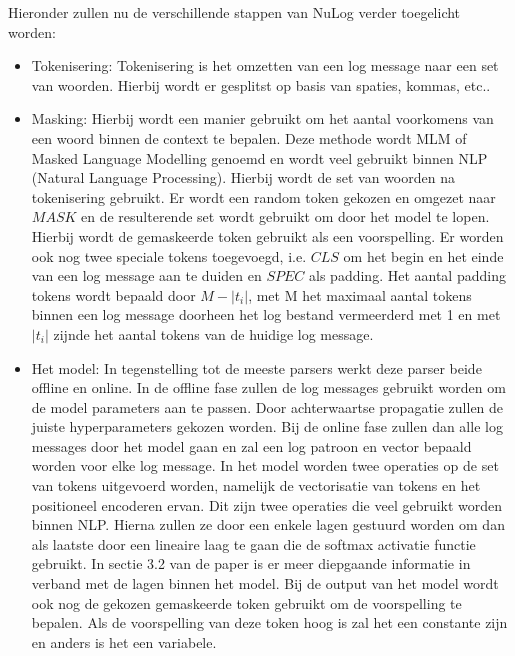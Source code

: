Hieronder zullen nu de verschillende stappen van NuLog verder toegelicht worden:
\begin{itemize}
    \item Tokenisering: Tokenisering is het omzetten van een log message naar een set van woorden. Hierbij wordt er gesplitst op basis van spaties, kommas, etc..\\
    
    \item Masking: Hierbij wordt een manier gebruikt om het aantal voorkomens van een woord binnen de context te bepalen. Deze methode wordt MLM of Masked Language Modelling genoemd en wordt veel gebruikt binnen NLP (Natural Language Processing). Hierbij wordt de set van woorden na tokenisering gebruikt. Er wordt een random token gekozen en omgezet naar $MASK$ en de resulterende set wordt gebruikt om door het model te lopen. Hierbij wordt de gemaskeerde token gebruikt als een voorspelling. Er worden ook nog twee speciale tokens toegevoegd, i.e. $CLS$ om het begin en het einde van een log message aan te duiden en $SPEC$ als padding. Het aantal padding tokens wordt bepaald door $M-\lvert t_{i} \rvert$, met M het maximaal aantal tokens binnen een log message doorheen het log bestand vermeerderd met 1 en met $\lvert t_{i} \rvert$ zijnde het aantal tokens van de huidige log message.\\
    
    \item Het model: In tegenstelling tot de meeste parsers werkt deze parser beide offline en online. In de offline fase zullen de log messages gebruikt worden om de model parameters aan te passen. Door achterwaartse propagatie zullen de juiste hyperparameters gekozen worden. Bij de online fase zullen dan alle log messages door het model gaan en zal een log patroon en vector bepaald worden voor elke log message. In het model worden twee operaties op de set van tokens uitgevoerd worden, namelijk de vectorisatie van tokens en het positioneel encoderen ervan. Dit zijn twee operaties die veel gebruikt worden binnen NLP. Hierna zullen ze door een enkele lagen gestuurd worden om dan als laatste door een lineaire laag te gaan die de softmax activatie functie gebruikt. In sectie 3.2 van de paper is er meer diepgaande informatie in verband met de lagen binnen het model. Bij de output van het model wordt ook nog de gekozen gemaskeerde token gebruikt om de voorspelling te bepalen. Als de voorspelling van deze token hoog is zal het een constante zijn en anders is het een variabele.
\end{itemize}

